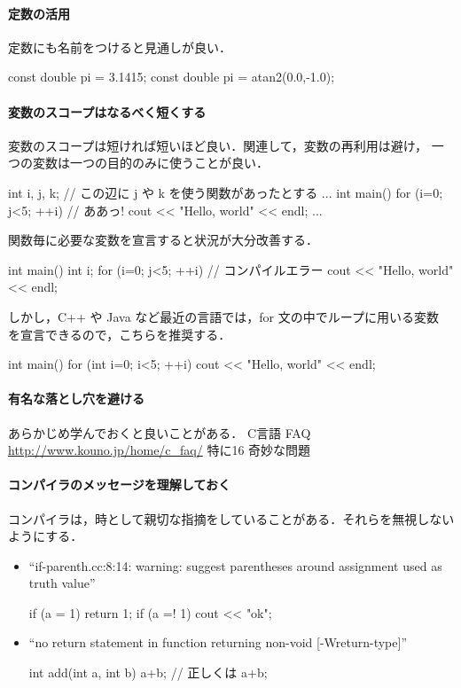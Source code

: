 \paragraph{定数の活用} 定数にも名前をつけると見通しが良い．
  \begin{cbox}
const double pi = 3.1415;
const double pi = atan2(0.0,-1.0);    
\end{cbox}
\paragraph{変数のスコープはなるべく短くする} 
変数のスコープは短ければ短いほど良い．関連して，変数の再利用は避け，
一つの変数は一つの目的のみに使うことが良い．
\begin{cbox}[emph={j}]
int i, j, k;
// この辺に j や k を使う関数があったとする
...
int main() {
  for (i=0; j<5; ++i) // ああっ!
    cout << "Hello, world" << endl;
  ...
}
\end{cbox}
関数毎に必要な変数を宣言すると状況が大分改善する．
\begin{cbox}
int main() {
  int i;
  for (i=0; j<5; ++i) // コンパイルエラー
    cout << "Hello, world" << endl;
}
\end{cbox}
しかし，C++ や Java など最近の言語では，for 文の中でループに用いる変数
を宣言できるので，こちらを推奨する．
\begin{cbox}
int main() {
  for (int i=0; i<5; ++i) 
    cout << "Hello, world" << endl;
}
\end{cbox}
\paragraph{有名な落とし穴を避ける} あらかじめ学んでおくと良いことがある．
    C言語 FAQ \url{http://www.kouno.jp/home/c_faq/} 特に16 奇妙な問題
\paragraph{コンパイラのメッセージを理解しておく} コンパイラは，時として親切な指摘をしていることがある．それらを無視しないようにする．
  \begin{itemize}
  \item ``if-parenth.cc:8:14: warning: suggest parentheses around assignment used as truth value''
\begin{cbox}
  if (a = 1) return 1;
  if (a =! 1) cout << "ok";
\end{cbox}
\item ``no return statement in function returning non-void [-Wreturn-type]''
\begin{cbox}
int add(int a, int b) {
  a+b; // 正しくは  a+b;
}
\end{cbox}
  \end{itemize}

